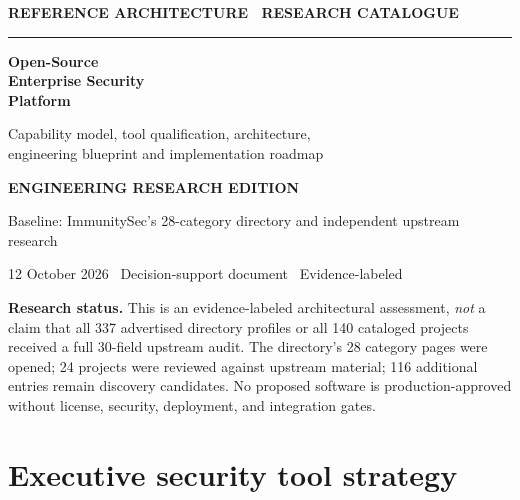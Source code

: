 \documentclass[11pt,oneside]{report}
\begin{document}
\hypersetup{pageanchor=false}%
\begin{titlepage}
\pagecolor{navy}\color{white}
\vspace*{1.05in}
{\sffamily\bfseries\fontsize{12}{15}\selectfont REFERENCE ARCHITECTURE \textbullet\ RESEARCH CATALOGUE}\par
\vspace{0.18in}
{\color{gold}\rule{0.82\textwidth}{2.5pt}}\par
\vspace{0.48in}
{\sffamily\bfseries\fontsize{35}{41}\selectfont Open-Source\\Enterprise Security\\Platform}\par
\vspace{0.27in}
{\sffamily\fontsize{17}{23}\selectfont Capability model, tool qualification, architecture,\\engineering blueprint and implementation roadmap}\par
\vfill
{\sffamily\bfseries\large ENGINEERING RESEARCH EDITION}\par
\vspace{0.15in}
{\sffamily\normalsize Baseline: ImmunitySec's 28-category directory and independent upstream research}\par
\vspace{0.23in}
{\sffamily\normalsize 12 October 2026 \textbullet\ Decision-support document \textbullet\ Evidence-labeled}\par
\vspace{0.3in}
\end{titlepage}\hypersetup{pageanchor=true}
\nopagecolor\color{ink}
\begin{insight}
\textbf{Research status.} This is an evidence-labeled architectural assessment, \emph{not} a claim that all 337 advertised directory profiles or all 140 cataloged projects received a full 30-field upstream audit. The directory's 28 category pages were opened; 24 projects were reviewed against upstream material; 116 additional entries remain discovery candidates. No proposed software is production-approved without license, security, deployment, and integration gates.
\end{insight}
\tableofcontents
\clearpage
{}

\chapter{Executive security tool strategy}
\end{document}
